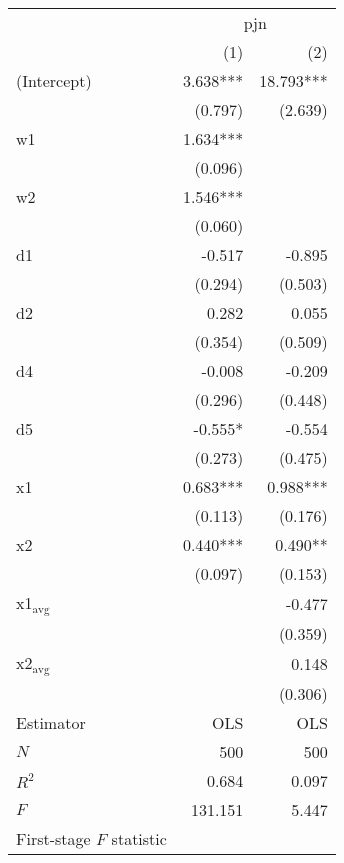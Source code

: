 \begin{tabular}{lrr}
\toprule
                          & \multicolumn{2}{c}{pjn} \\ 
\cmidrule(lr){2-3} 
                          &      (1) &          (2) \\ 
\midrule
(Intercept)               & 3.638*** &    18.793*** \\ 
                          &  (0.797) &      (2.639) \\ 
w1                        & 1.634*** &              \\ 
                          &  (0.096) &              \\ 
w2                        & 1.546*** &              \\ 
                          &  (0.060) &              \\ 
d1                        &   -0.517 &       -0.895 \\ 
                          &  (0.294) &      (0.503) \\ 
d2                        &    0.282 &        0.055 \\ 
                          &  (0.354) &      (0.509) \\ 
d4                        &   -0.008 &       -0.209 \\ 
                          &  (0.296) &      (0.448) \\ 
d5                        &  -0.555* &       -0.554 \\ 
                          &  (0.273) &      (0.475) \\ 
x1                        & 0.683*** &     0.988*** \\ 
                          &  (0.113) &      (0.176) \\ 
x2                        & 0.440*** &      0.490** \\ 
                          &  (0.097) &      (0.153) \\ 
x1$_{\text{avg}}$         &          &       -0.477 \\ 
                          &          &      (0.359) \\ 
x2$_{\text{avg}}$         &          &        0.148 \\ 
                          &          &      (0.306) \\ 
\midrule
Estimator                 &      OLS &          OLS \\ 
\midrule
$N$                       &      500 &          500 \\ 
$R^2$                     &    0.684 &        0.097 \\ 
$F$                       &  131.151 &        5.447 \\ 
First-stage $F$ statistic &          &              \\ 
\bottomrule
\end{tabular}
